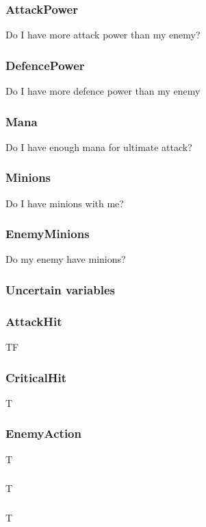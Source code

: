 \documentclass[titlepage]{article}
\begin{document}
\subsubsection*{AttackPower}
Do I have more attack power than my enemy?

\subsubsection*{DefencePower}
Do I have more defence power than my enemy

\subsubsection*{Mana}
Do I have enough mana for ultimate attack? 

\subsubsection*{Minions}
Do I have minions with me?

\subsubsection*{EnemyMinions}
Do my enemy have minions?




\subsubsection{Uncertain variables}
\subsubsection*{AttackHit}
TF

\subsubsection*{CriticalHit}
T

\subsubsection*{EnemyAction}
T


\subsubsection*{}
T

\subsubsection*{}
T
\end{document}
